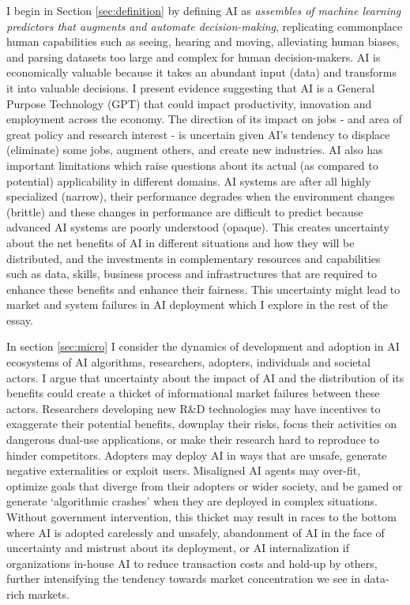 \documentclass[11pt]{article}
\begin{document}
 I begin in Section \ref{sec:definition} by defining AI as \textit{assembles of machine learning predictors that augments and automate decision-making}, replicating commonplace human capabilities such as seeing, hearing and moving, alleviating human biases, and parsing datasets too large and complex for human decision-makers. AI is economically valuable because it takes an abundant input (data) and transforms it into valuable decisions. I present evidence suggesting that AI is a General Purpose Technology (GPT) that could impact productivity, innovation and employment across the economy. The direction of its impact on jobs - and area of great policy and research interest - is uncertain given AI's tendency to displace (eliminate) some jobs, augment others, and create new industries. AI also has important limitations which raise questions about its actual (as compared to potential) applicability in different domains. AI systems are after all highly specialized (narrow), their performance degrades when the environment changes (brittle) and these changes in performance are difficult to predict because advanced AI systems are poorly understood (opaque). This creates uncertainty about the net benefits of AI in different situations and how they will be distributed, and the investments in complementary resources and capabilities such as data, skills, business process and infrastructures that are required to enhance these benefits and enhance their fairness. This uncertainty might lead to market and system failures in AI deployment which I explore in the rest of the essay.
 
 In section \ref{sec:micro} I consider the dynamics of development and adoption in AI ecosystems of AI algorithms, researchers, adopters, individuals and societal actors. I argue that uncertainty about the impact of AI and the distribution of its benefits could create a thicket of informational market failures between these actors. Researchers developing new R\&D technologies may have incentives to exaggerate their potential benefits, downplay their risks, focus their activities on dangerous dual-use applications, or make their research hard to reproduce to hinder competitors. Adopters may deploy AI in ways that are unsafe, generate negative externalities or exploit users. Misaligned AI agents may over-fit, optimize goals that diverge from their adopters or wider society, and be gamed or generate `algorithmic crashes' when they are deployed in complex situations. Without government intervention, this thicket may result in races to the bottom where AI is adopted carelessly and unsafely, abandonment of AI in the face of uncertainty and mistrust about its deployment, or AI internalization if organizations in-house AI to reduce transaction costs and hold-up by others, further intensifying the tendency towards market concentration we see in data-rich markets. 
 
\end{document}
